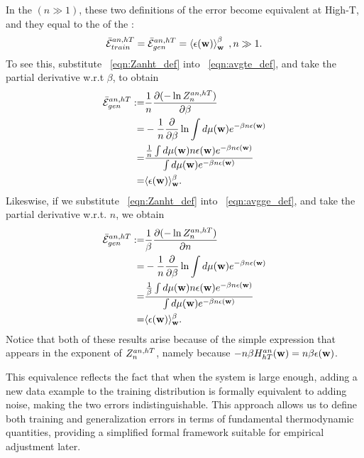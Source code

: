 In the \ThermodynamicLimit $(n \gg 1)$, these two definitions of the error become equivalent at High-T,
and they equal to the \ThermalAverage of the \EffectivePotential:
\begin{align}
  \bar{\mathcal{E}}_{train}^{an, hT} = \bar{\mathcal{E}}_{gen}^{an, hT} = \left\langle \epsilon({\mathbf{w}}) \right\rangle_{\mathbf w}^{\beta}\;,n\gg 1 .
\end{align}
To see this, substitute \EQN~\ref{eqn:Zanht_def} into \EQN~\ref{eqn:avgte_def}, and take the partial derivative w.r.t $\beta$, to obtain
\begin{align}
  \label{eqn:avgge_anhT}
  \bar{\mathcal{E}}_{gen}^{an, hT} :=&\frac{1}{n}\dfrac{\partial (-\ln Z^{an,hT}_{n})}{\partial \beta}  \\ \nonumber
   =& - \dfrac{1}{n}\dfrac{\partial}{\partial \beta}\ln\int d\mu({\mathbf{w}})e^{-\beta n\epsilon({\mathbf{w}})} \\  \nonumber
   =&  \dfrac{
              \tfrac{1}{n}  \int  d\mu({\mathbf{w}}) n\epsilon({\mathbf{w}}) e^{-\beta n\epsilon({\mathbf{w}})} 
             }{
              \int  d\mu({\mathbf{w}}) e^{-\beta n\epsilon({\mathbf{w}})} 
   } \\ \nonumber
   =&\langle\epsilon({\mathbf{w}}) \rangle_{{\mathbf{w}}}^{\beta} .
  \end{align}
Likeswise, if we substitute \EQN~\ref{eqn:Zanht_def} into \EQN~\ref{eqn:avgge_def}, and take the partial derivative w.r.t. $n$, we obtain
\begin{align}
  \label{eqn:avgte_anhT}
    \bar{\mathcal{E}}_{gen}^{an, hT}  :=& \frac{1}{\beta}\dfrac{\partial (-\ln Z^{an,hT}_{n})}{\partial n} \\ \nonumber
    =& - \dfrac{1}{n}\dfrac{\partial}{\partial \beta}\ln\int d\mu({\mathbf{w}})e^{-\beta n\epsilon({\mathbf{w}})} \\  \nonumber
   =&  \dfrac{
              \tfrac{1}{\beta}  \int  d\mu({\mathbf{w}}) n\epsilon({\mathbf{w}}) e^{-\beta n\epsilon({\mathbf{w}})} 
             }{
     \int  d\mu({\mathbf{w}}) e^{-\beta n\epsilon({\mathbf{w}})} 
   } \\ \nonumber
   =&\langle\epsilon({\mathbf{w}}) \rangle_{{\mathbf{w}}}^{\beta} .
\end{align}
Notice that both of these results arise because of the simple expression that appears in the exponent of $Z^{an,hT}_{n}$, namely because $-n\beta H^{an}_{hT}({\mathbf{w}})=n\beta\epsilon({\mathbf{w}})$.


This equivalence reflects the fact that when the system is large enough, adding a new data example to the
training distribution is formally equivalent to adding noise, making the two errors indistinguishable.
This approach allows us to define both training and generalization errors in terms of fundamental thermodynamic quantities,
providing a simplified formal framework suitable for empirical adjustment later.

